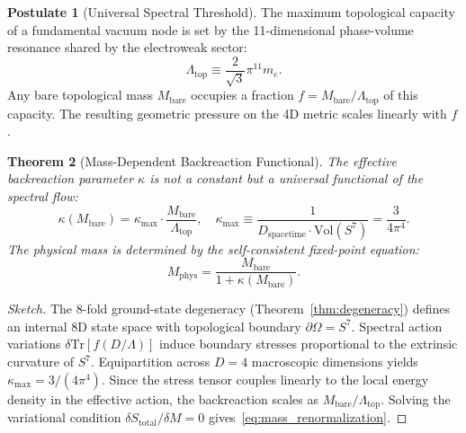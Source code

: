 \documentclass[onecolumn,aps,prd,superscriptaddress,nofootinbib,amsmath,amssymb]{revtex4-2}
\newtheorem{theorem}{Theorem}[section]
\theoremstyle{definition}
\newtheorem{postulate}[theorem]{Postulate}
\theoremstyle{remark}
\begin{document}
\begin{postulate}[Universal Spectral Threshold]
\label{post:saturation}
The maximum topological capacity of a fundamental vacuum node is set by the 11-dimensional phase-volume resonance shared by the electroweak sector:
\begin{equation}
\Lambda_{\text{top}} \equiv \frac{2}{\sqrt{3}}\pi^{11} m_e.
\label{eq:lambda_top}
\end{equation}
Any bare topological mass $M_{\text{bare}}$ occupies a fraction $f = M_{\text{bare}}/\Lambda_{\text{top}}$ of this capacity. The resulting geometric pressure on the 4D metric scales linearly with $f$.
\end{postulate}

\begin{theorem}[Mass-Dependent Backreaction Functional]
\label{thm:universal_kappa}
The effective backreaction parameter $\kappa$ is not a constant but a universal functional of the spectral flow:
\begin{equation}
\kappa(M_{\text{bare}}) = \kappa_{\text{max}} \cdot \frac{M_{\text{bare}}}{\Lambda_{\text{top}}}, \quad 
\kappa_{\text{max}} \equiv \frac{1}{D_{\text{spacetime}} \cdot \text{Vol}(S^7)} = \frac{3}{4\pi^4}.
\label{eq:kappa_functional}
\end{equation}
The physical mass is determined by the self-consistent fixed-point equation:
\begin{equation}
M_{\text{phys}} = \frac{M_{\text{bare}}}{1 + \kappa(M_{\text{bare}})}.
\label{eq:mass_renormalization}
\end{equation}
\end{theorem}

\begin{proof}[Sketch]
The 8-fold ground-state degeneracy (Theorem~\ref{thm:degeneracy}) defines an internal 8D state space with topological boundary $\partial \Omega = S^7$. Spectral action variations $\delta \text{Tr}[f(D/\Lambda)]$ induce boundary stresses proportional to the extrinsic curvature of $S^7$. Equipartition across $D=4$ macroscopic dimensions yields $\kappa_{\text{max}} = 3/(4\pi^4)$. Since the stress tensor couples linearly to the local energy density in the effective action, the backreaction scales as $M_{\text{bare}}/\Lambda_{\text{top}}$. Solving the variational condition $\delta S_{\text{total}}/\delta M = 0$ gives~\eqref{eq:mass_renormalization}.
\end{proof}
\end{document}
